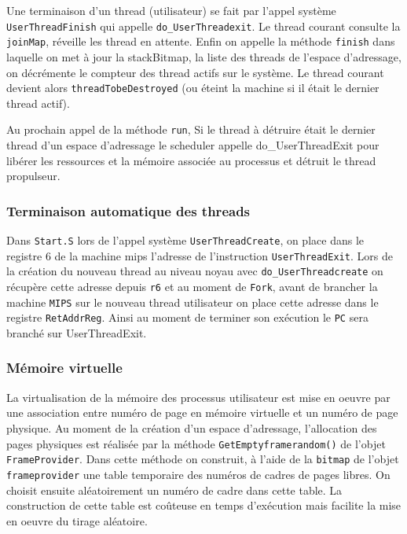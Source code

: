 \documentclass[11pt]{article}
\begin{document}
Une terminaison d'un thread (utilisateur) se fait par l'appel système \texttt{UserThreadFinish} qui appelle \texttt{do\_UserThreadexit}. Le thread courant consulte la \texttt{joinMap}, réveille les thread en attente. Enfin on appelle la méthode \texttt{finish} dans laquelle on met à jour la stackBitmap, la liste des threads de l'espace d'adressage, on décrémente le compteur des thread actifs sur le système. Le thread courant devient alors \texttt{threadTobeDestroyed} (ou éteint la machine si il était le dernier thread actif).

Au prochain appel de la méthode \texttt{run}, Si le thread à détruire était le dernier thread d'un espace d'adressage le scheduler appelle do\_UserThreadExit pour libérer les ressources et la mémoire associée au processus et détruit le thread propulseur.

\subsubsection{Terminaison automatique des threads}
Dans \texttt{Start.S} lors de l'appel système \texttt{UserThreadCreate}, on place dans le registre 6 de la machine mips l'adresse de l'instruction \texttt{UserThreadExit}.
Lors de la création du nouveau thread au niveau noyau avec \texttt{do\_UserThreadcreate} on récupère
cette adresse depuis \texttt{r6} et au moment de \texttt{Fork}, avant de brancher la machine \texttt{MIPS} sur
le nouveau thread utilisateur on place cette adresse dans le registre \texttt{RetAddrReg}. Ainsi au moment de terminer son exécution le \texttt{PC} sera branché sur UserThreadExit.

\subsubsection{Mémoire virtuelle}
La virtualisation de la mémoire des processus utilisateur est mise en oeuvre par une association entre numéro
de page en mémoire virtuelle et un numéro de page physique. Au moment de la création d'un espace d'adressage, l'allocation des pages physiques est réalisée par la méthode \texttt{GetEmptyframerandom()} de l'objet \texttt{FrameProvider}.
Dans cette méthode on construit, à l'aide de la \texttt{bitmap} de l'objet \texttt{frameprovider} une table temporaire des numéros de cadres de pages libres.
On choisit ensuite aléatoirement un numéro de cadre dans cette table. La construction de cette table est coûteuse en temps d'exécution mais facilite la mise en oeuvre du tirage aléatoire.
\end{document}
